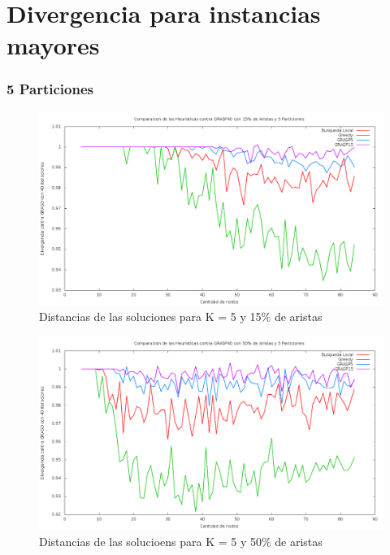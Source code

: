 \section{Divergencia para instancias mayores}

\subsubsection{5 Particiones}

\begin{figure}[H]
\begin{center}
\includegraphics[scale=0.3]{finales/muchosComparacionesCon5Particiones15Aristas.png}
\caption{Distancias de las soluciones para K = 5 y 15\% de aristas}
\end{center}
\end{figure}

\begin{figure}[H]
\begin{center}
\includegraphics[scale=0.3]{finales/muchosComparacionesCon5Particiones50Aristas.png}
\caption{Distancias de las solucioens para K = 5 y 50\% de aristas}
\end{center}
\end{figure}

